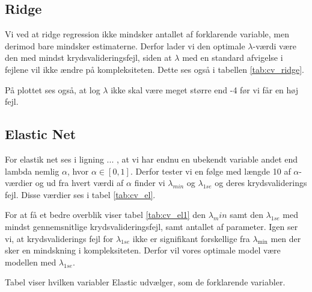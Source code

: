 \subsection{Ridge}
Vi ved at ridge regression ikke mindsker antallet af forklarende variable, men derimod bare mindsker estimaterne. Derfor lader vi den optimale $\lambda$-værdi være den med mindst krydsvalideringsfejl, siden at $\lambda$ med en standard afvigelse i fejlene vil ikke ændre på kompleksiteten. Dette ses også i tabellen \ref{tab:cv_ridge}. 


På plottet ses også, at log $\lambda$ ikke skal være meget større end -4 før vi får en høj fejl.


\newpage

\subsection{Elastic Net}
For elastik net ses i ligning ... , at vi har endnu en ubekendt variable andet end lambda nemlig $\alpha$, hvor $\alpha \in [0,1]$. Derfor tester vi en følge med længde 10 af $\alpha$-værdier og ud fra hvert værdi af $\alpha$ finder vi $\lambda_{min}$ og $\lambda_{1se}$ og deres krydsvaliderings fejl. Disse værdier ses i tabel \ref{tab:cv_el}. 


For at få et bedre overblik viser tabel  \ref{tab:cv_el1}  den $\lambda_min$ samt den $\lambda_{1se}$ med mindst gennemsnitlige krydsvalideringsfejl, samt antallet af parameter. 
Igen ser vi, at krydsvaliderings fejl for $\lambda_{1se}$ ikke er signifikant forskellige fra $\lambda_{\min}$ men der sker en mindskning i kompleksiteten. Derfor vil vores optimale model være modellen med $\lambda_{1se}$. 

Tabel viser hvilken variabler Elastic udvælger, som de forklarende variabler. 











